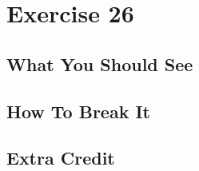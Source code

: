 \chapter{Exercise 26}


\section{What You Should See}


\section{How To Break It}


\section{Extra Credit}



